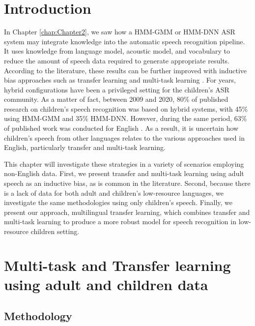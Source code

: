 \label{chapter:Hybrid}
\cleardoublepage
\section{Introduction}
In Chapter \ref{chap:Chapter2}, we saw how a HMM-GMM or HMM-DNN ASR system may integrate knowledge into the automatic speech recognition pipeline. It uses knowledge from language model, acoustic model, and vocabulary to reduce the amount of speech data required to generate appropriate results. According to the literature, these results can be further improved with inductive bias approaches such as transfer learning and multi-task learning \cite{TransferLF}. For years, hybrid configurations have been a privileged setting for the children's ASR community. As a matter of fact, between 2009 and 2020, 80\% of published research on children's speech recognition was based on hybrid systems, with 45\% using HMM-GMM and 35\% HMM-DNN. However, during the same period, 63\% of published work was conducted for English \cite{big_review_childASR}. As a result, it is uncertain how children's speech from other languages relates to the various approaches used in English, particularly transfer and multi-task learning.

This chapter will investigate these strategies in a variety of scenarios employing non-English data. First, we present transfer and multi-task learning using adult speech as an inductive bias, as is common in the literature. Second, because there is a lack of data for both adult and children's low-resource languages, we investigate the same methodologies using only children's speech. Finally, we present our approach, multilingual transfer learning, which combines transfer and multi-task learning to produce a more robust model for speech recognition in low-resource children setting.

\section{Multi-task and Transfer learning using adult and children data}
\label{section:HMMDNNADULT2CHILD}
\subsection{Methodology}


